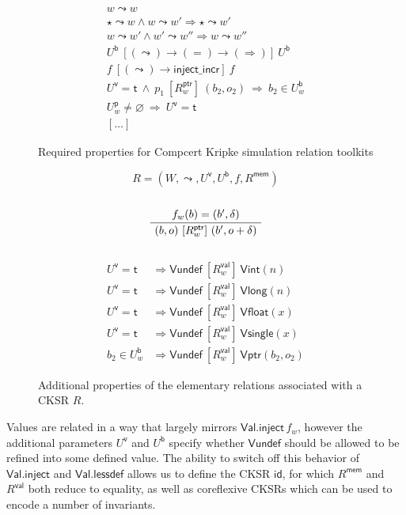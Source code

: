 \documentclass[acmsmall,anonymous]{acmart}
\newcommand{\kw}[1]{\ensuremath{ \textsf{#1} }}
\newcommand{\ifr}[1]{\ [{#1}]\ }
\begin{document}
\begin{figure} %
  \begin{gather*}
    w \leadsto w \\
    \star \leadsto w \wedge w \leadsto w' \Rightarrow \star \leadsto w' \\
    w \leadsto w' \wedge w' \leadsto w'' \Rightarrow w \leadsto w'' \\
    U^\kw{b} \ifr{(\leadsto) \rightarrow (=) \rightarrow (\Rightarrow)} U^\kw{b} \\
    f \ifr{(\leadsto) \rightarrow \kw{inject\_incr}} f \\
    U^\kw{v} = \kw{t} \ \wedge\  p_1 \ifr{R^\kw{ptr}_w} (b_2, o_2) \ \Rightarrow\  b_2 \in U^\kw{b}_w \\
    U^\kw{p}_w \neq \varnothing \ \Rightarrow\  U^\kw{v} = \kw{t} \\
    [\ldots]
  \end{gather*}
  \caption{Required properties for Compcert Kripke simulation relation toolkits}
  \label{fig:simrelprop}
\end{figure}

\begin{figure} %
  \small
  \[ R = (W, \leadsto, U^\kw{v}, U^\kw{b}, f, R^\kw{mem}) \]
  \noindent \fbox{$R_w^\kw{ptr}$} \hfill \ 
  \[
    \AxiomC{$f_w(b) = (b', \delta)$}
    \UnaryInfC{$(b, o) \ifr{R_w^\kw{ptr}} (b', o + \delta)$}
    \DisplayProof
  \]
  \noindent \fbox{$R_w^\kw{val}$} \hfill \ 
  \begin{align*}
    U^\kw{v} = \kw{t} &\Rightarrow
        \kw{Vundef} \ifr{R_w^\kw{val}} \kw{Vint}(n)
        \\
    U^\kw{v} = \kw{t} &\Rightarrow
        \kw{Vundef} \ifr{R_w^\kw{val}} \kw{Vlong}(n)
        \\
    U^\kw{v} = \kw{t} &\Rightarrow
        \kw{Vundef} \ifr{R_w^\kw{val}} \kw{Vfloat}(x)
        \\
    U^\kw{v} = \kw{t} &\Rightarrow
        \kw{Vundef} \ifr{R_w^\kw{val}} \kw{Vsingle}(x)
        \\
    b_2 \in U^\kw{b}_w &\Rightarrow
        \kw{Vundef} \ifr{R_w^\kw{val}} \kw{Vptr}(b_2, o_2)
  \end{align*}
  \caption{Additional properties of the elementary relations associated with a CKSR $R$.}
  \label{fig:simrel}
\end{figure}

Values are related in a way that largely mirrors $\kw{Val.inject}\,f_w$,
however the additional parameters $U^\kw{v}$ and $U^\kw{b}$
specify whether $\kw{Vundef}$ should be allowed to be refined
into some defined value.
The ability to switch off this behavior of \kw{Val.inject} and \kw{Val.lessdef}
allows us to define the CKSR \kw{id},
for which $R^\kw{mem}$ and $R^\kw{val}$ both reduce to equality,
as well as coreflexive CKSRs
which can be used to encode a number of invariants.
\end{document}
